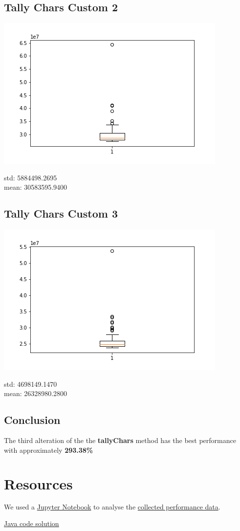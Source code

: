 \documentclass[a4paper,11pt]{article}
\theoremstyle{mytheor}
\begin{document}
\subsection*{Tally Chars Custom 2}
\includegraphics{assets/Tally_Chars_Custom_2.png}

\noindent std: 5884498.2695 \\
mean: 30583595.9400

\subsection*{Tally Chars Custom 3}
\includegraphics{assets/Tally_Chars_Custom_3.png}

\noindent std: 4698149.1470 \\
mean: 26328980.2800

\subsection*{Conclusion}

The third alteration of the the \textbf{tallyChars} method has the best performance with approximately \textbf{293.38\%}

\section*{Resources}
We used a \href{https://github.com/Soft20/UFO-Assignment-2/blob/main/src/analysis/notebook.ipynb}{Jupyter Notebook} to analyse the \href{https://github.com/Soft20/UFO-Assignment-2/blob/main/src/analysis/observations.csv}{collected performance data}.

\noindent \href{https://github.com/Soft20/UFO-Assignment-2/blob/main/src/main/java/cphbusiness/ufo/letterfrequencies/Main.java}{Java code solution}
\end{document}
